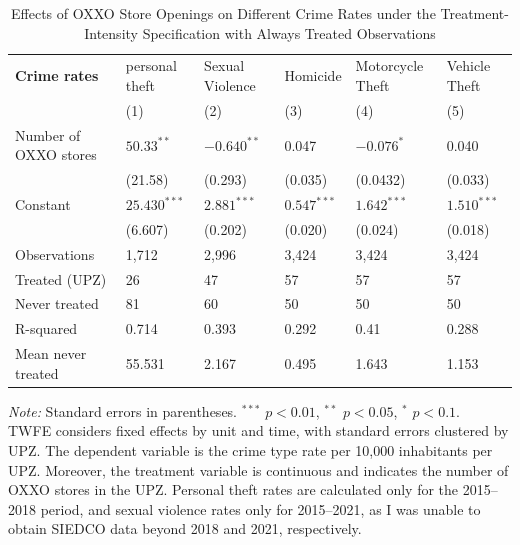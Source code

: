 \documentclass[12pt]{article}
\begin{document}
\begin{table}[H]
\centering
\caption{Effects of OXXO Store Openings on Different Crime Rates under the Treatment-Intensity Specification with Always Treated Observations}
\label{tab:resultados_regresion_intensity_always_treated}
\small


\begin{tabularx}{\textwidth}{l C C C C C}
\hline\hline
\textbf{Crime rates} & personal theft & Sexual Violence & Homicide & Motorcycle Theft & Vehicle Theft \\
                     & (1) & (2) & (3) & (4) & (5) \\
\hline
Number of OXXO stores & $50.33^{**}$   & $-0.640^{**}$ & 0.047         & $-0.076^{*}$  & 0.040 \\
                      & (21.58)        & (0.293)       & (0.035)       & (0.0432)      & (0.033) \\
Constant              & $25.430^{***}$ & $2.881^{***}$ & $0.547^{***}$ & $1.642^{***}$ & $1.510^{***}$ \\
                      & (6.607)        & (0.202)       & (0.020)       & (0.024)       & (0.018) \\
\hline
Observations          & 1,712          & 2,996         & 3,424         & 3,424         & 3,424 \\
Treated (UPZ)         & 26             & 47            & 57            & 57            & 57 \\
Never treated         & 81             & 60            & 50            & 50            & 50 \\
R-squared             & 0.714          & 0.393         & 0.292         & 0.41          & 0.288 \\
Mean never treated    & 55.531         & 2.167         & 0.495         & 1.643         & 1.153 \\
\hline\hline
\end{tabularx}

\vspace{0.5em}
\parbox{\textwidth}{\footnotesize
    \textit{Note:} Standard errors in parentheses. $^{***}$ $p<0.01$, $^{**}$ $p<0.05$, $^{*}$ $p<0.1$. \\
    TWFE considers fixed effects by unit and time, with standard errors clustered by UPZ. 
    The dependent variable is the crime type rate per 10,000 inhabitants per UPZ. 
    Moreover, the treatment variable is continuous and indicates the number of OXXO stores in the UPZ.
    Personal theft rates are calculated only for the 2015–2018 period, and sexual violence rates only for 2015–2021, as I was unable to obtain SIEDCO data beyond 2018 and 2021, respectively.
}
\end{table}
\end{document}
